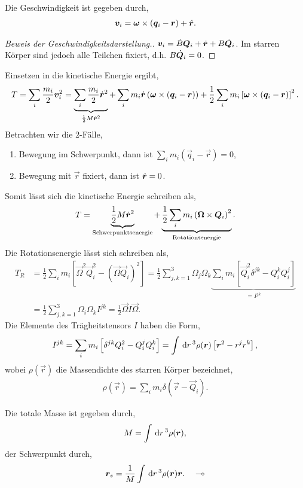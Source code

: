 Die Geschwindigkeit ist gegeben durch,
\begin{align*}
\bm{v}_i = \bm{\omega}\times \left(\bm{q}_i - \bm{r}\right) + \dot{\bm{r}}.
\end{align*}
\begin{proof}[Beweis der Geschwindigkeitsdarstellung.]
$\bm{v}_i = \dot{B}\bm{Q}_i + \dot{\bm{r}} + B\dot{\bm{Q}}_i$. Im starren Körper sind
jedoch alle Teilchen fixiert, d.h. $B\dot{\bm{Q}}_i = 0$.\qedhere
\end{proof}
Einsetzen in die kinetische Energie ergibt,
\begin{align*}
T = \sum_i \frac{m_i}{2}\bm{v}_i^2 = 
\underbrace{\sum_i \frac{m_i}{2}\dot{\bm{r}}^2}_{\frac{1}{2}M\dot{\bm{r}}^2} +
\sum_i m_i \dot{\bm{r}} \left(\bm{\omega}\times \left(\bm{q}_i
-\bm{r} \right) \right) + \frac{1}{2}\sum_i m_i
\left[\bm{\omega}\times \left(\bm{q}_i - \bm{r}\right) \right]^2.
\end{align*}
Betrachten wir die $2$-Fälle,
\begin{enumerate}[label=(\roman{*})]
  \item Bewegung im Schwerpunkt, dann ist $\sum_i m_i(\vec{q}_i -\vec{r}) = 0$,
  \item Bewegung mit $\vec{r}$ fixiert, dann ist $\dot{\bm{r}} = 0$.
\end{enumerate}
Somit lässt sich die kinetische Energie schreiben als,
\begin{align*}
T = \underbrace{\frac{1}{2}M\dot{\bm{r}}^2}_{\text{Schwerpunktsenergie}}+
\underbrace{\frac{1}{2}\sum_i m_i \left(\bm{\Omega}\times \bm{Q}_i
\right)^2}_{\text{Rotationsenergie}}.
\end{align*}
Die Rotationsenergie lässt sich schreiben als,
\begin{align*}
T_R &= \frac{1}{2}\sum_i m_i \left[\vec{\Omega}^2\vec{Q}_i^2 -
\left(\vec{\Omega}\vec{Q}_i\right)^2 \right] = \frac{1}{2}
\sum\limits_{j,k=1}^3 \Omega_j\Omega_k \underbrace{\sum_i m_i\left[ \vec{Q}_i^2
\delta^{jk} - Q_i^k Q_i^j \right]}_{=I^{jk}}\\
&= \frac{1}{2}\sum\limits_{j,k=1}^3 \Omega_i \Omega_k I^{jk}
= \frac{1}{2}\vec{\Omega} I \vec{\Omega}.
\end{align*}
Die Elemente des Trägheitstensors $I$ haben die Form,
\begin{align*}
I^{jk} = \sum\limits_{i}m_i \left[\delta^{jk} Q_i^2 - Q_i^jQ_i^k \right]
= \int\,\mathrm{d} r\,^3 \rho(\bm{r}) \left[\bm{r}^2 - r^jr^k\right],
\end{align*}
wobei $\rho(\vec{r})$ die Massendichte des starren Körper bezeichnet,
\begin{align*}
\rho(\vec{r}) = \sum_ i m_i \delta(\vec{r}-\vec{Q}_i).
\end{align*}
\begin{bemn}
Die totale Masse ist gegeben durch,
\begin{align*}
M  = \int\,\mathrm{d} r\,^3 \rho(\bm{r}),
\end{align*}
der Schwerpunkt durch,
\begin{align*}
\bm{r}_s = \frac{1}{M}\int\,\mathrm{d} r\,^3 \rho(\bm{r})\bm{r}.\quad\multimap
\end{align*}
\end{bemn}

